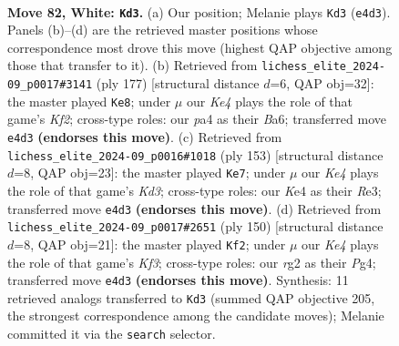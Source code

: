 \documentclass[11pt]{article}
\begin{document}
\clearpage

\begin{figure}[p]\centering
\begin{subfigure}{0.46\textwidth}\centering
\resizebox{\linewidth}{!}{%
\newchessgame
\chessboard[
  setfen={8/8/5k2/2p5/p2pK3/8/6r1/8 w - - 4 82},
  showmover=false,
  pgfstyle=straightmove, color=movearrow, markmove={e4-d3}
]}
\caption{}
\end{subfigure}\hfill
\begin{subfigure}{0.46\textwidth}\centering
\resizebox{\linewidth}{!}{%
\newchessgame
\chessboard[
  setfen={8/4Pk2/b4P2/2R5/8/8/6K1/8 b - - 2 89},
  showmover=false,
  pgfstyle=straightmove, color=movearrow, markmove={f7-e8}
]}
\caption{}
\end{subfigure}
\\[4pt]
\begin{subfigure}{0.46\textwidth}\centering
\resizebox{\linewidth}{!}{%
\newchessgame
\chessboard[
  setfen={8/6K1/3kP3/5P2/8/4r3/8/8 b - - 2 77},
  showmover=false,
  pgfstyle=straightmove, color=movearrow, markmove={d6-e7}
]}
\caption{}
\end{subfigure}\hfill
\begin{subfigure}{0.46\textwidth}\centering
\resizebox{\linewidth}{!}{%
\newchessgame
\chessboard[
  setfen={8/8/1p6/3k2p1/5pP1/5K2/8/8 w - - 4 76},
  showmover=false,
  pgfstyle=straightmove, color=movearrow, markmove={f3-f2}
]}
\caption{}
\end{subfigure}
\caption{\textbf{Move 82, White: \texttt{Kd3}.} (a) Our position; Melanie plays \texttt{Kd3} (\texttt{e4d3}). Panels (b)--(d) are the retrieved master positions whose correspondence most drove this move (highest QAP objective among those that transfer to it). (b) Retrieved from \texttt{lichess\_elite\_2024-09\_p0017\#3141} (ply 177) [structural distance $d$=6, QAP obj=32]: the master played \texttt{Ke8}; under $\mu$ our \emph{Ke4} plays the role of that game's \emph{Kf2}; cross-type roles: our \emph{p}a4 as their \emph{B}a6; transferred move \texttt{e4d3} \textbf{(endorses this move)}. (c) Retrieved from \texttt{lichess\_elite\_2024-09\_p0016\#1018} (ply 153) [structural distance $d$=8, QAP obj=23]: the master played \texttt{Ke7}; under $\mu$ our \emph{Ke4} plays the role of that game's \emph{Kd3}; cross-type roles: our \emph{K}e4 as their \emph{R}e3; transferred move \texttt{e4d3} \textbf{(endorses this move)}. (d) Retrieved from \texttt{lichess\_elite\_2024-09\_p0017\#2651} (ply 150) [structural distance $d$=8, QAP obj=21]: the master played \texttt{Kf2}; under $\mu$ our \emph{Ke4} plays the role of that game's \emph{Kf3}; cross-type roles: our \emph{r}g2 as their \emph{P}g4; transferred move \texttt{e4d3} \textbf{(endorses this move)}. Synthesis: 11 retrieved analogs transferred to \texttt{Kd3} (summed QAP objective 205, the strongest correspondence among the candidate moves); Melanie committed it via the \texttt{search} selector.}
\label{fig:thought-m162}
\end{figure}
\end{document}
